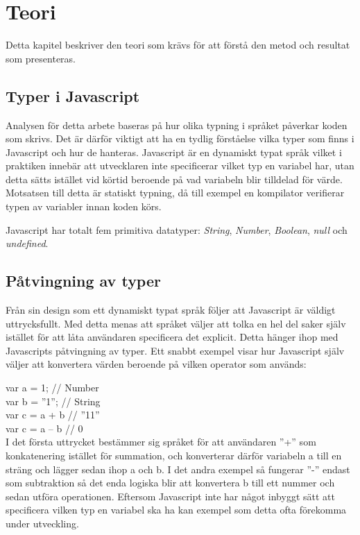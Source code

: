 \section{Teori}
\label{sec:alexander-theory}

Detta kapitel beskriver den teori som krävs för att förstå den metod och resultat som presenteras.

\subsection{Typer i Javascript}

Analysen för detta arbete baseras på hur olika typning i språket påverkar koden som skrivs. Det är därför viktigt att ha en tydlig förståelse vilka typer som finns i Javascript och hur de hanteras. Javascript är en dynamiskt typat språk vilket i praktiken innebär att utvecklaren inte specificerar vilket typ en variabel har, utan detta sätts istället vid körtid beroende på vad variabeln blir tilldelad för värde. Motsatsen till detta är statiskt typning, då till exempel en kompilator verifierar typen av variabler innan koden körs.

Javascript har totalt fem primitiva datatyper: \textit{String}, \textit{Number}, \textit{Boolean}, \textit{null} och \textit{undefined}.

\subsection{Påtvingning av typer}

Från sin design som ett dynamiskt typat språk följer att Javascript är väldigt uttrycksfullt. Med detta menas att språket väljer att tolka en hel del saker själv istället för att låta användaren specificera det explicit. Detta hänger ihop med Javascripts påtvingning av typer. Ett snabbt exempel visar hur Javascript själv väljer att konvertera värden beroende på vilken operator som används:

var a = 1; // Number\\
var b = ”1”; // String\\
var c = a + b // ”11”\\
var c = a – b // 0\\

I det första uttrycket bestämmer sig språket för att användaren ”+” som konkatenering istället för summation, och konverterar därför variabeln a till en sträng och lägger sedan ihop a och b. I det andra exempel så fungerar ”-” endast som subtraktion så det enda logiska blir att konvertera b till ett nummer och sedan utföra operationen. Eftersom Javascript inte har något inbyggt sätt att specificera vilken typ en variabel ska ha kan exempel som detta ofta förekomma under utveckling.

